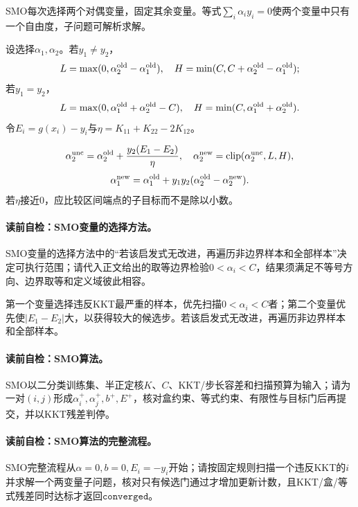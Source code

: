 SMO每次选择两个对偶变量，固定其余变量。等式$\sum_i\alpha_iy_i=0$使两个变量中只有一个自由度，子问题可解析求解。

设选择$\alpha_1,\alpha_2$。若$y_1\neq y_2$，
\[
L=\max(0,\alpha_2^{\rm old}-\alpha_1^{\rm old}),\quad
H=\min(C,C+\alpha_2^{\rm old}-\alpha_1^{\rm old});
\]
若$y_1=y_2$，
\[
L=\max(0,\alpha_1^{\rm old}+\alpha_2^{\rm old}-C),\quad
H=\min(C,\alpha_1^{\rm old}+\alpha_2^{\rm old}).
\]
令$E_i=g(x_i)-y_i$与$\eta=K_{11}+K_{22}-2K_{12}$。

\[
\alpha_2^{\rm unc}
=\alpha_2^{\rm old}+\frac{y_2(E_1-E_2)}{\eta},
\quad
\alpha_2^{\rm new}=\operatorname{clip}(\alpha_2^{\rm unc},L,H),
\]
\[
\alpha_1^{\rm new}
=\alpha_1^{\rm old}+y_1y_2(\alpha_2^{\rm old}-\alpha_2^{\rm new}).
\]
若$\eta$接近0，应比较区间端点的子目标而不是除以小数。

\paragraph{读前自检：SMO变量的选择方法。}SMO变量的选择方法中的“若该启发式无改进，再遍历非边界样本和全部样本”决定可执行范围；请代入正文给出的取等边界检验$0<\alpha_i<C$，结果须满足不等号方向、边界取等和定义域彼此相容。\par

第一个变量选择违反KKT最严重的样本，优先扫描$0<\alpha_i<C$者；第二个变量优先使$|E_1-E_2|$大，以获得较大的候选步。若该启发式无改进，再遍历非边界样本和全部样本。

\paragraph{读前自检：SMO算法。}SMO以二分类训练集、半正定核$K$、$C$、KKT/步长容差和扫描预算为输入；请为一对$(i,j)$形成$\alpha_i^+,\alpha_j^+,b^+,E^+$，核对盒约束、等式约束、有限性与目标门后再提交，并以KKT残差判停。\par
\paragraph{读前自检：SMO算法的完整流程。}SMO完整流程从$\alpha=0,b=0,E_i=-y_i$开始；请按固定规则扫描一个违反KKT的$i$并求解一个两变量子问题，核对只有候选门通过才增加更新计数，且KKT/盒/等式残差同时达标才返回$\mathtt{converged}$。\par

